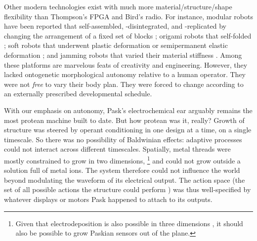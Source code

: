 Other modern technologies exist with much more material/structure/shape flexibility than Thompson's FPGA and Bird's radio.
For instance,
modular robots have been reported that self-assembled, -disintegrated, and -replicated by changing the arrangement of a fixed set of blocks \cite{zykov2005robotics,romanishin20153d,li2019particle,white2005three};
origami robots that self-folded
\cite{hawkes2010programmable,felton2014method,miyashita2017robotic,gladman2016biomimetic};
soft robots that underwent plastic deformation or semipermanent elastic deformation
\cite{shepherd2011multigait,shah2019morphing,shah2020gaining};
and jamming robots that varied their material stiffness \cite{brown2010universal,narang2018transforming,steltz2009jsel}.
Among these platforms are marvelous feats of creativity and engineering.
However, they lacked ontogenetic morphological autonomy relative to a human operator.
They were not \textit{free} to vary their body plan.
They were forced to change according to an externally prescribed developmental schedule.




With our emphasis on autonomy,
Pask's electrochemical ear 
arguably remains the most protean machine built to date.
But how protean was it, really?
Growth of structure was steered by operant conditioning in one design at a time, on a single timescale.
So there was no possibility of Baldwinian effects: adaptive processes could not interact across different timescales.
Spatially,
metal threads were mostly constrained to grow 
in two dimensions,%
\footnote{%
Given that electrodeposition is also possible in three dimensions \cite{madden1995fabrication}, it should also be possible to grow Paskian sensors out of the plane.
}
and could not grow outside a solution full of metal ions.
The system therefore could not influence the world beyond modulating the waveform of its electrical output.
The action space
(the set of all possible actions the structure could perform \cite{sutton2018reinforcement})
was thus well-specified by whatever displays or motors Pask happened to attach to its outputs.

